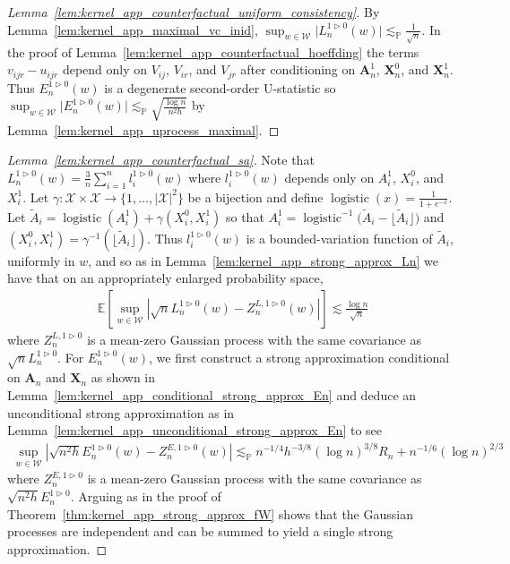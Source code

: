 \documentclass[11pt,lof]{puthesis}
\renewcommand{\P}{\ensuremath{\mathbb{P}}}
\newcommand{\E}{\ensuremath{\mathbb{E}}}
\newcommand{\bX}{\ensuremath{\mathbf{X}}}
\newcommand{\bA}{\ensuremath{\mathbf{A}}}
\newcommand{\cX}{\ensuremath{\mathcal{X}}}
\newcommand{\cW}{\ensuremath{\mathcal{W}}}
\DeclareMathOperator*{\logistic}{logistic}
\theoremstyle{break}
\theoremstyle{proof}
\newtheorem{proof}{Proof}
\begin{document}
\begin{proof}[Lemma~\ref{lem:kernel_app_counterfactual_uniform_consistency}]

By Lemma~\ref{lem:kernel_app_maximal_vc_inid},
$\sup_{w \in \cW} \big|L_n^{1 \triangleright 0}(w)\big|
\lesssim_\P \frac{1}{\sqrt n}$.
In the proof of Lemma~\ref{lem:kernel_app_counterfactual_hoeffding}
the terms $v_{i j r} - u_{i j r}$ depend only on
$V_{i j}$, $V_{i r}$, and $V_{jr}$
after conditioning on $\bA_n^1$, $\bX_n^0$, and $\bX_n^1$.
Thus $E_n^{1 \triangleright 0}(w)$ is a degenerate second-order
U-statistic so
$\sup_{w \in \cW} \big|E_n^{1 \triangleright 0}(w)\big|
\lesssim_\P \sqrt{\frac{\log n}{n^2h}}$
by Lemma~\ref{lem:kernel_app_uprocess_maximal}.
%
\end{proof}

\begin{proof}[Lemma~\ref{lem:kernel_app_counterfactual_sa}]

Note that
$L_n^{1 \triangleright 0}(w)
= \frac 3n \sum_{i=1}^n l_i^{1 \triangleright 0}(w)$
where $l_i^{1 \triangleright 0}(w)$ depends only on
$A_i^1$, $X_i^0$, and $X_i^1$.
Let $\gamma: \cX \times \cX \to \{1, \ldots, |\cX|^2\}$
be a bijection and
define $\logistic(x) = \frac{1}{1+e^{-x}}$.
Let
$\tilde A_i = \logistic(A_i^1) + \gamma(X_i^0, X_i^1)$
so that
$A_i^1 = \logistic^{-1}\big(\tilde A_i
- \lfloor \tilde A_i \rfloor\big)$
and
$(X_i^0, X_i^1) = \gamma^{-1}(\lfloor \tilde A_i \rfloor)$.
Thus
$l_i^{1 \triangleright 0}(w)$ is a bounded-variation function
of $\tilde A_i$, uniformly in $w$, and so as in
Lemma~\ref{lem:kernel_app_strong_approx_Ln} we have that
on an appropriately enlarged probability space,
%
\begin{align*}
\E\left[
\sup_{w \in \cW}
\left|
\sqrt n L_n^{1 \triangleright 0}(w)
- Z_n^{L, 1 \triangleright 0}(w)
\right|
\right]
\lesssim
\frac{\log n}{\sqrt n}
\end{align*}
%
where $Z_n^{L, 1 \triangleright 0}$ is a mean-zero
Gaussian process with the same covariance as
$\sqrt n L_n^{1 \triangleright 0}$.
For $E_n^{1 \triangleright 0}(w)$,
we first construct a strong approximation conditional on
$\bA_n$ and $\bX_n$ as shown in
Lemma~\ref{lem:kernel_app_conditional_strong_approx_En}
and deduce an unconditional strong approximation as in
Lemma~\ref{lem:kernel_app_unconditional_strong_approx_En} to see
%
\begin{align*}
\sup_{w \in \cW}
\left|
\sqrt{n^2h} E_n^{1 \triangleright 0}(w)
- Z_n^{E, 1 \triangleright 0}(w)
\right|
\lesssim_\P
n^{-1/4} h^{-3/8} (\log n)^{3/8} R_n
+ n^{-1/6} (\log n)^{2/3}
\end{align*}
%
where $Z_n^{E, 1 \triangleright 0}$ is a mean-zero
Gaussian process with the same covariance as
$\sqrt{n^2h} E_n^{1 \triangleright 0}$.
Arguing as in the proof of Theorem~\ref{thm:kernel_app_strong_approx_fW}
shows that the Gaussian processes are independent
and can be summed to yield a single strong approximation.
%
\end{proof}
\end{document}
